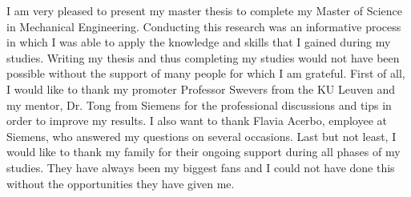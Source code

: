 \documentclass[master=ewtk,english]{kulemt}
\begin{document}

\begin{preface}
	I am very pleased to present my master thesis to complete my Master of Science in Mechanical Engineering. Conducting this research was an informative process in which I was able to apply the knowledge and skills that I gained during my studies. Writing my thesis and thus completing my studies would not have been possible without the support of many people for which I am grateful. First of all, I would like to thank my promoter Professor Swevers from the KU Leuven and my mentor, Dr. Tong from Siemens for the professional discussions and tips in order to improve my results. I also want to thank Flavia Acerbo, employee at Siemens, who answered my questions on several occasions. Last but not least, I would like to thank my family for their ongoing support during all phases of my studies. They have always been my biggest fans and I could not have done this without the opportunities they have given me. 
	
\end{preface}

\tableofcontents*
\end{document}
